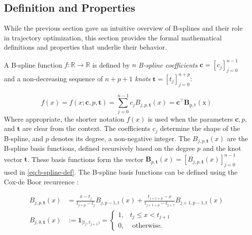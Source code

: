 \subsection{Definition and Properties}\label{sec:b-spline-definition}
While the previous section gave an intuitive overview of B-splines and their role in trajectory optimization, this section provides the formal mathematical definitions and properties that underlie their behavior.


A B-spline function $f: \mathbb{R} \rightarrow \mathbb{R}$ is defined by $n$ \emph{B-spline coefficients} $\mathbf{c} = [c_j]_{j=0}^{n-1}$ and a non-decreasing sequence of $n+p+1$ \emph{knots} $\mathbf{t} = [t_j]_{j=0}^{n+p}$:

\begin{equation}\label{eq:b-spline-def}
    f(x) = f(x ; \mathbf{c}, p, \mathbf{t})=\sum_{j=0}^{n-1} c_j B_{j, p, \mathbf{t}}(x)=\mathbf{c}^{\top} \mathbf{B}_{\mathrm{p}, \mathrm{t}}(\mathrm{x})
\end{equation}
Where appropriate, the shorter notation $f(x)$ is used when the parameters $\mathbf{c}, p$, and $\mathbf{t}$ are clear from the context. The coefficients $c_j$ determine the shape of the B-spline, and $p$ denotes its degree, a non-negative integer. The $B_{j, p, \mathbf{t}}(x)$ are the B-spline basis functions, defined recursively based on the degree $p$ and the knot vector $\mathbf{t}$. These basis functions form the vector $\mathbf{B}_{p, \mathbf{t}}(x) = [B_{j, p, \mathbf{t}}(x)]_{j=0}^{n-1}$ used in \cref{eq:b-spline-def}. The B-spline basis functions can be defined using the Cox-de Boor recurrence \citep{deBoor1978practicalguide}:

\begin{subequations}\label{eq:b-spline-recurrence}
    \begin{align}
        B_{j, p, \mathbf{t}}(x) & =\frac{x-t_j}{t_{j+p}-t_j} B_{j, p-1, \mathrm{t}}(x)+\frac{t_{j+1+p}-x}{t_{j+1+p}-t_{j+1}} B_{j+1, p-1, \mathrm{t}}(x) \label{eq:b-spline-recurrence-p} \\
        B_{j, 0, \mathbf{t}}(x) & := 
        \mathbf 1_{[t_j, t_{j+1})} =
        \begin{cases}
            1, & t_j \leq x<t_{j+1} \\
            0, & \text { otherwise. }
        \end{cases} \label{eq:b-spline-recurrence-0}
    \end{align}
\end{subequations}

